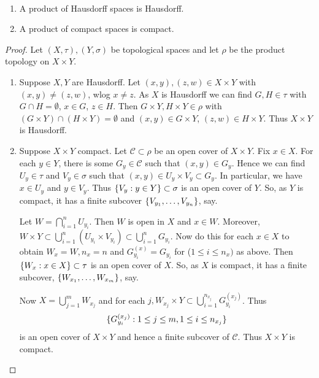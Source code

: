 \begin{theorem} \label{prp:39} ~\vspace*{-1.5\baselineskip}
\begin{enumerate}
    \item A product of Hausdorff spaces is Hausdorff.
    \item A product of compact spaces is compact.
\end{enumerate}
\end{theorem}

\begin{proof}
Let $(X,\tau), (Y,\sigma)$ be topological spaces and let $\rho$ be the product topology on $X\times Y$.
\begin{enumerate}
    \item Suppose $X,Y$ are Hausdorff. Let $(x,y), (z,w)\in X\times Y$ with $(x,y)\neq (z,w)$, wlog $x\neq z$. As $X$ is Hausdorff we can find $G,H\in \tau$ with $G\cap H = \emptyset$, $x\in G$, $z\in H$. Then $G\times Y, H\times Y\in \rho$ with $(G\times Y)\cap (H\times Y) = \emptyset$ and $(x,y)\in G\times Y$, $(z,w) \in H\times Y$. Thus $X\times Y$ is Hausdorff.
    \item Suppose $X\times Y$ compact. Let $\mathcal{C}\subset\rho$ be an open cover of $X\times Y$. Fix $x \in X$. For each $y\in Y$, there is some $G_y\in \mathcal{C}$ such that $(x,y)\in G_y$. Hence we can find $U_y\in \tau$ and $V_y\in \sigma$ such that $(x,y)\in U_y\times V_y\subset G_y$. In particular, we have $x\in U_y$ and $y\in V_y$. Thus $\{V_y : y\in Y\}\subset \sigma$ is an open cover of $Y$. So, as $Y$ is compact, it has a finite subcover $\{V_{y_1},\dots, V_{y_n}\}$, say.
    
    Let $W = \bigcap_{i=1}^n U_{y_i}$. Then $W$ is open in $X$ and $x\in W$. Moreover, $W\times Y \subset \bigcup_{i=1}^n (U_{y_i}\times V_{y_i}) \subset \bigcup_{i=1}^n G_{y_i}$. Now do this for each $x\in X$ to obtain $W_x = W, n_x = n$ and $G_{y_i}^{(x)} = G_{y_i}$ for ($1 \leq i  \leq n_x)$ as above. Then $\{W_x : x\in X\}\subset \tau$ is an open cover of $X$. So, as $X$ is compact, it has a finite subcover, $\{W_{x_1},\dots , W_{x_m}\}$, say.
    
    Now $X = \bigcup_{j=1}^m W_{x_j}$ and for each $j, W_{x_j}\times Y\subset \bigcup_{i=1}^{n_{x_j}} G_{y_i}^{(x_j)}$. Thus \[\{G_{y_i}^{(x_j)} : 1 \leq j \leq m, 1 \leq i \leq n_{x_j}\}\] is an open cover of $X\times Y$ and hence a finite subcover of $\mathcal{C}$. Thus $X\times Y$ is compact.
\end{enumerate}
\end{proof}

